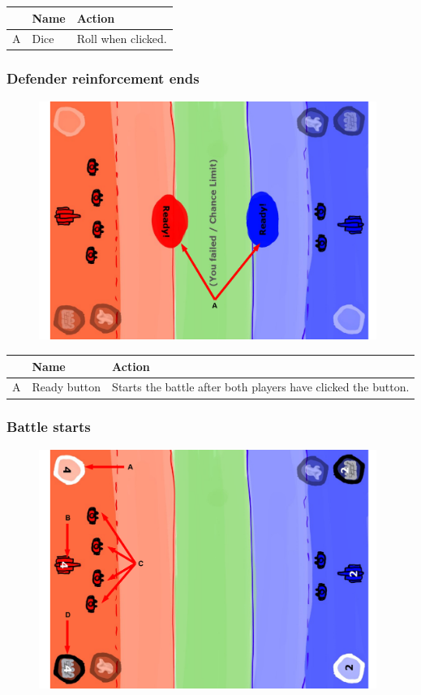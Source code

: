 \documentclass[12pt,a4paper]{article}
\begin{document}
\begin{table}[H]
\small
\centering
\begin{tabular}{c|p{5cm}|p{7cm}}
& Name & Action \\ \hline\hline
A
&Dice
&Roll when clicked.
\end{tabular}
\end{table}

\newpage
\subsubsection{Defender reinforcement ends}\label{mock:762}

\begin{figure}[H]
  \centering
  \includegraphics[width=11cm]{pic/mocks/6-2.pdf}
\end{figure}

\begin{table}[H]
\small
\centering
\begin{tabular}{c|p{5cm}|p{7cm}}
& Name & Action \\ \hline\hline
A
&Ready button
&Starts the battle after both players have clicked the button.
\end{tabular}
\end{table}

\newpage
\subsubsection{Battle starts}\label{mock:763}

\begin{figure}[H]
  \centering
  \includegraphics[width=11cm]{pic/mocks/6-3.pdf}
\end{figure}
\end{document}
